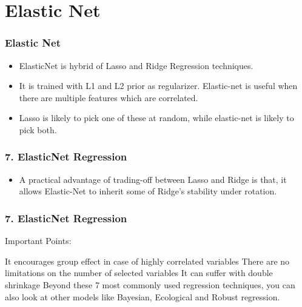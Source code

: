 \documentclass{beamer}
\begin{document}
\section{Elastic Net}
\begin{frame}
	\frametitle{Elastic Net}
	\begin{itemize}
	\item ElasticNet is hybrid of Lasso and Ridge Regression techniques. 
	\item It is trained with L1 and L2 prior as regularizer. Elastic-net is useful when there are multiple features which are correlated. 
	\item Lasso is likely to pick one of these at random, while elastic-net is likely to pick both.
	\end{itemize}
	
\end{frame}
\begin{frame}
	\frametitle{7. ElasticNet Regression}

	
	\begin{itemize}
\item 	A practical advantage of trading-off between Lasso and Ridge is that, it allows Elastic-Net to inherit some of Ridge’s stability under rotation.
	\end{itemize}

\end{frame}
\begin{frame}
	\frametitle{7. ElasticNet Regression}
	Important Points:
	
	It encourages group effect in case of highly correlated variables
	There are no limitations on the number of selected variables
	It can suffer with double shrinkage
	Beyond these 7 most commonly used regression techniques, you can also look at other models like Bayesian, Ecological and Robust regression.
	
\end{frame}
\end{document}
